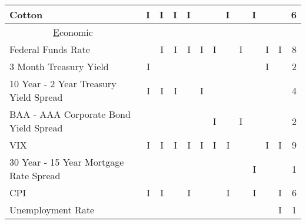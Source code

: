 \documentclass[12pt,a4paper,english]{article}
\begin{document}
\begin{table}[H]
\begin{minipage}{\textwidth}
{\begin{tabular}{@{}lrrrrrrrrrrr|r@{}}
				Cotton                                         & I                                 & I                             & I                               & I                                  &   &   & I &   & I &   &   & 6 \\ \midrule
				\multicolumn{1}{c}{{\ul Economic}}             &                                   &                               &                                 &                                    &   &   &   &   &   &   &   &   \\
				Federal Funds Rate                             &                                   & I                             & I                               & I                                  & I & I &   & I &   & I & I & 8 \\
				3 Month Treasury Yield                         & I                                 &                               &                                 &                                    &   &   &   &   &   & I &   & 2 \\
				10 Year - 2 Year Treasury   Yield Spread       & I                                 & I                             & I                               &                                    & I &   &   &   &   &   &   & 4 \\
				BAA - AAA Corporate Bond Yield   Spread        &                                   &                               &                                 &                                    &   & I &   & I &   &   &   & 2 \\
				VIX                                            & I                                 & I                             & I                               & I                                  & I & I & I &   &   & I & I & 9 \\
				30 Year - 15 Year Mortgage   Rate Spread       &                                   &                               &                                 &                                    &   &   &   &   & I &   &   & 1 \\
				CPI                                            & I                                 & I                             &                                 & I                                  &   &   & I &   & I &   & I & 6 \\
				Unemployment Rate                              &                                   &                               &                                 &                                    &   &   &   &   &   &   & I & 1 \\

\end{tabular}}
\end{minipage}
\end{table}
\end{document}
